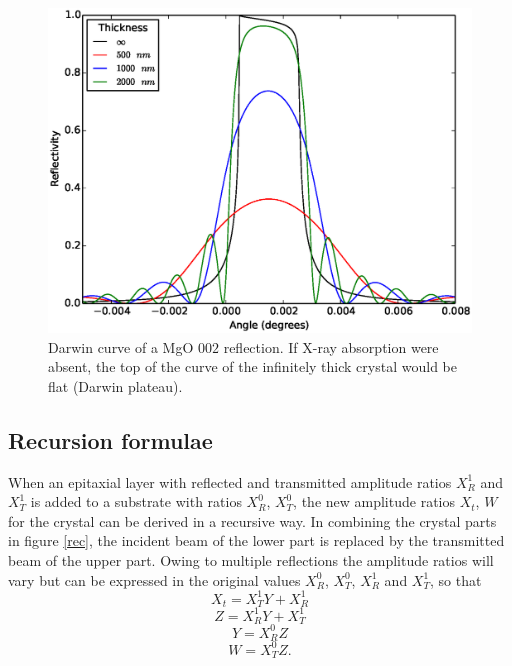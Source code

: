 \documentclass[12pt,oneside,notitlepage,abstracton,a4paper]{scrartcl}
\begin{document}
\begin{figure}[h]
\begin{center}
\includegraphics[width=12 cm]{pics/dynamical.eps}
\caption{Darwin curve of a MgO $002$ reflection. If X-ray absorption were absent, the top of the curve of the infinitely thick crystal would be flat (Darwin plateau).}
\label{dyn}
\end{center}
\end{figure}


\newpage
\subsection{Recursion formulae}



When an epitaxial layer with reflected and transmitted amplitude ratios $X_R^1$ and $X_T^1$ is added to a substrate with ratios $X_R^0$, $X_T^0$, the new amplitude ratios $X_t$, $W$ for the crystal can be derived in a recursive way. In combining the crystal parts in figure \ref{rec}, the incident beam of the lower part is replaced by the transmitted beam of the upper part. Owing to multiple reflections the amplitude ratios will vary but can be expressed in the original values $X_R^0$, $X_T^0$, $X_R^1$ and $X_T^1$, so that
\begin{equation}
 X_t=X_T^1 Y+X_R^1
\end{equation}
\begin{equation}
 Z=X_R^1 Y+X_T^1
\end{equation}
\begin{equation}
 Y=X_R^0 Z
\end{equation}
\begin{equation}
 W=X_T^0 Z.
\end{equation}
\end{document}
